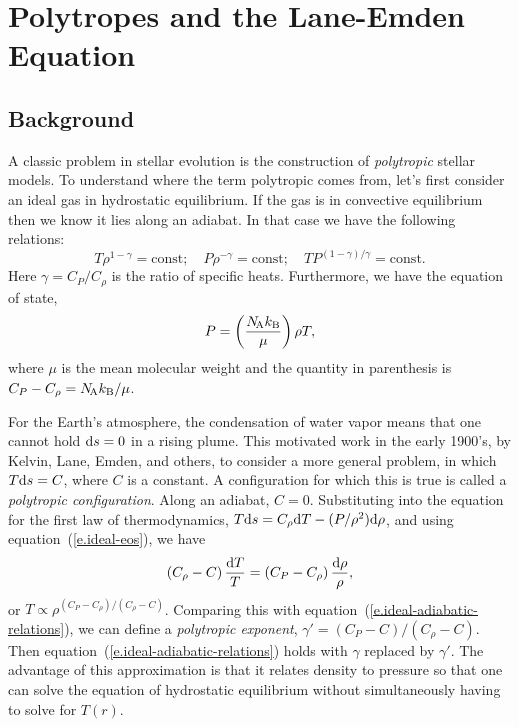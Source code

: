 \chapter{Polytropes and the Lane-Emden Equation}

\section{Background}\label{s.LE-background}

A classic problem in stellar evolution is the construction of \emph{polytropic} stellar models.  To understand where the term polytropic comes from, let's first consider an ideal gas in hydrostatic equilibrium.  If the gas is in convective equilibrium then we know it lies along an adiabat.  In that case we have the following relations:
\begin{equation}\label{e.ideal-adiabatic-relations} 
T\rho^{1-\gamma} = \mathrm{const};\quad P\rho^{-\gamma} = \mathrm{const};\quad TP^{(1-\gamma)/\gamma} = \mathrm{const}.
\end{equation}
Here $\gamma = C_{P}/C_{\rho}$ is the ratio of specific heats. Furthermore, we have the equation of state,
\begin{equation}\label{e.ideal-eos}
P = \left(\frac{N_\mathrm{\!A}k_\mathrm{B}}{\mu}\right)\rho T,
\end{equation}
where $\mu$ is the mean molecular weight and the quantity in parenthesis is $C_{P}-C_{\rho} = N_\mathrm{\!A}k_\mathrm{B}/\mu$.

For the Earth's atmosphere, the condensation of water vapor means that one cannot hold $\mathrm{d} s = 0$ in a rising plume.  This motivated work in the early 1900's, by Kelvin, Lane, Emden, and others, to consider a more general problem, in which $T\mathrm{d} s = C$, where $C$ is a constant.  A configuration for which this is true is called a \emph{polytropic configuration}. Along an adiabat, $C = 0$. Substituting into the equation for the first law of thermodynamics, $T\mathrm{d} s = C_{\rho}\mathrm{d} T -(P/\rho^{2})\mathrm{d} \rho$, and using equation~(\ref{e.ideal-eos}), we have
\[
\left(C_{\rho}-C\right)\frac{\mathrm{d} T}{T} = \left( C_{P} - C_{\rho}\right)\frac{\mathrm{d}\rho}{\rho},
\]
or $T  \propto  \rho^{(C_{P}-C_{\rho})/(C_{\rho}-C)}$. Comparing this with equation~(\ref{e.ideal-adiabatic-relations}), we can define a \emph{polytropic exponent}, $\gamma' = (C_{P}-C)/(C_{\rho}-C)$. Then equation~(\ref{e.ideal-adiabatic-relations}) holds with $\gamma$ replaced by $\gamma'$.  The advantage of this approximation is that it relates density to pressure so that one can solve the equation of hydrostatic equilibrium without simultaneously having to solve for $T(r)$.

